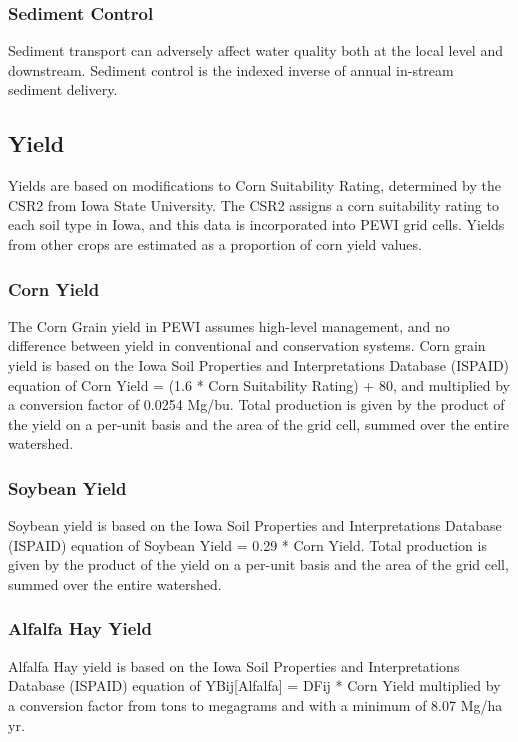 \documentclass[11pt]{article}
\begin{document}
\subsubsection{Sediment Control}
Sediment transport can adversely affect water quality both at the local level and downstream. Sediment control is the indexed inverse of annual in-stream sediment delivery. 

\subsection{Yield}
Yields are based on modifications to Corn Suitability Rating, determined by the CSR2 from Iowa State University. The CSR2 assigns a corn suitability rating to each soil type in Iowa, and this data is incorporated into PEWI grid cells. Yields from other crops are estimated as a proportion of corn yield values. 

\subsubsection{Corn Yield}
The Corn Grain yield in PEWI assumes high-level management, and no difference between yield in conventional and conservation systems. Corn grain yield is based on the Iowa Soil Properties and Interpretations Database (ISPAID) equation of Corn Yield = (1.6 * Corn Suitability Rating) + 80, and multiplied by a conversion factor of 0.0254 Mg/bu.\cite{42}  
 Total production is given by the product of the yield on a per-unit basis and the area of the grid cell, summed over the entire watershed. 
 
\subsubsection{Soybean Yield}
Soybean yield is based on the Iowa Soil Properties and Interpretations Database (ISPAID) equation of Soybean Yield = 0.29 * Corn Yield. Total production is given by the product of the yield on a per-unit basis and the area of the grid cell, summed over the entire watershed. 

\subsubsection{Alfalfa Hay Yield}
Alfalfa Hay yield is based on the Iowa Soil Properties and Interpretations Database  (ISPAID) equation of YBij[Alfalfa] = DFij * Corn Yield multiplied by a conversion factor from tons to megagrams and with a minimum of 8.07 Mg/ha yr.\cite{43} 
\end{document}
